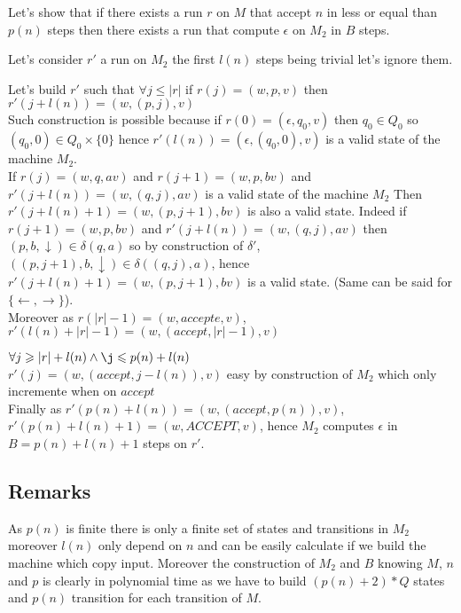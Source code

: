 Let's show that if there exists a run $r$ on $M$ that accept $n$ in less or equal than $p(n)$ steps then there exists a run that compute $\epsilon$ on $M_2$ in $B$ steps. 

Let's consider $r'$ a run on $M_2$ the first $l(n)$ steps being trivial let's ignore them.

Let's build $r'$ such that $\forall j \leq |r| $ if $r(j) = (w,p,v)$ then $r'(j+l(n)) = (w,(p,j),v)$
\\Such construction is possible because if $r(0) = (\epsilon,q_0,v) $ then $q_0\in Q_0$ so $(q_0,0) \in Q_0 \times \{0\}$ hence $r'(l(n)) =  (\epsilon,(q_0,0),v)$ is a valid state of the machine $M_2$.
\\If $r(j) = (w,q,av)$ and  $r(j+1) = (w,p,bv)$ and $r'(j+l(n)) = (w,(q,j),av)$ is a valid state of the machine $M_2$ Then $r'(j+l(n)+1) = (w,(p,j+1),bv)$ is also a valid state.
Indeed if $r(j+1) = (w,p,bv)$ and $r'(j+l(n)) = (w,(q,j),av)$ then $(p,b,\downarrow) \in \delta(q,a)$ so by construction of $\delta'$, $((p,j+1),b,\downarrow) \in \delta((q,j),a)$,
hence $r'(j+l(n)+1) = (w,(p,j+1),bv)$ is a valid state. 
(Same can be said for $\{\leftarrow, \rightarrow \}$).
\\Moreover as $r(|r|-1) = (w,accepte,v)$, $r'(l(n)+|r|-1) = (w,(accept,|r|-1),v)$

$\forall j \geq|r|+l(n) \land \j \leq p(n) +l(n) $
\\$r'(j) = (w,(accept,j-l(n)),v) $ easy by construction of $M_2$ which only incremente when on $accept$
\\Finally as $r'(p(n) +l(n)) = (w,(accept,p(n)),v) $, $r'(p(n) +l(n) +1) = (w,ACCEPT,v)$, hence $M_2$ computes $\epsilon$ in $B = p(n) + l(n) +1$ steps on $r'$.

\subsection{Remarks}

As $p(n)$ is finite there is only a finite set of states and  transitions in $M_2$ moreover $l(n)$ only depend on $n$ and can be easily calculate if we build the machine which copy input. Moreover the construction of $M_2$ and $B$ knowing $M$, $n$ and $p$ is clearly in polynomial time as we have to build $(p(n)+2) * Q$ states and $p(n)$ transition for each transition of $M$.